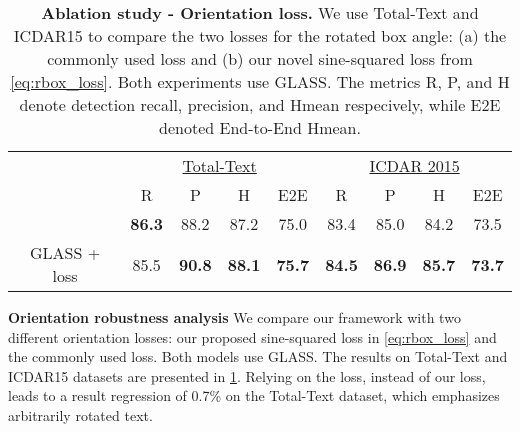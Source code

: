 \documentclass[runningheads]{llncs}
\begin{document}
\begin{table}[t]
\centering
\caption{\textbf{Ablation study - Orientation loss.}
We use Total-Text and ICDAR15 to compare the two losses for the rotated box angle: (a) the commonly used  loss and (b) our novel sine-squared loss from \cref{eq:rbox_loss}.
Both experiments use GLASS. The metrics R, P, and H denote detection recall, precision, and Hmean respecively, while E2E denoted End-to-End Hmean.}
\label{tab:ablation3}
\begin{tabular}{ccccccccc}
\toprule
\multicolumn{1}{c}{\multirow{3}{*}{}} & \multicolumn{4}{c}{\underline{Total-Text}}& 
\multicolumn{4}{c}{\underline{ICDAR 2015}} \\
\multicolumn{1}{c}{}                        & R      & P      & H      &   E2E       & R      & P      & H      &         E2E      \\ \hline


GLASS + { loss}      & \textbf{86.3}   &  88.2   &  87.2             &  75.0  & 83.4   &  85.0   &  84.2             &  73.5
\\
GLASS +  { loss}      & 85.5  & \textbf{90.8} & \textbf{88.1}              & \textbf{75.7}   & \textbf{84.5}   &  \textbf{86.9}   &  \textbf{85.7}             &  \textbf{73.7} 
\\ \bottomrule
\end{tabular}

\end{table}
 \noindent \textbf{Orientation robustness analysis}
\label{sec:angle_analysis}
We compare our framework with two different orientation losses: our proposed sine-squared loss in \cref{eq:rbox_loss} and the commonly used  loss. Both models use GLASS.
The results on Total-Text and ICDAR15 datasets are presented in \cref{tab:ablation3}.
Relying on the  loss, instead of our    loss, leads to a result regression of 0.7\% on the Total-Text dataset, which emphasizes arbitrarily rotated text.
\end{document}
